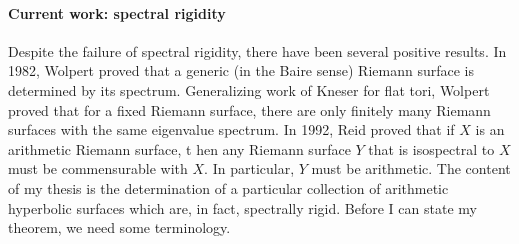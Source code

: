 \documentclass[12pt]{article}
\begin{document}
\paragraph{Current work: spectral rigidity}
Despite the failure of spectral rigidity, there have been several positive results. In 1982, Wolpert  \cite{wolpert1978}  proved that a generic (in the Baire sense) Riemann surface is determined by its spectrum. Generalizing work of Kneser for flat tori, Wolpert proved that for a fixed Riemann surface, there are only finitely many Riemann surfaces with the same eigenvalue spectrum. In 1992, Reid proved that if $X$ is an arithmetic Riemann surface, t hen any Riemann surface $Y$ that is isospectral to $X$ must be commensurable with $X$. In particular, $Y$ must be arithmetic. The content of my thesis is the determination of a particular collection of arithmetic  hyperbolic surfaces which are, in fact, spectrally rigid. Before I can state my theorem, we need some terminology. 
\end{document}
